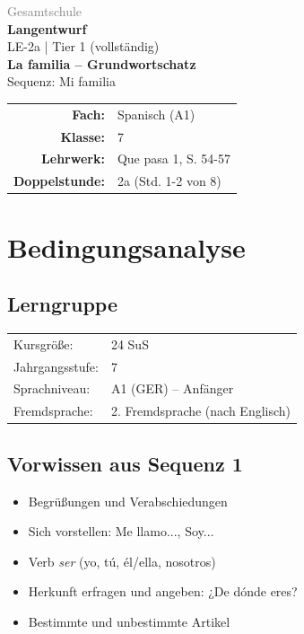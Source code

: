 \documentclass[11pt,a4paper]{article}
\newcommand{\fach}{Spanisch}
\newcommand{\jahrgangsstufe}{7}
\newcommand{\schulart}{Gesamtschule}
\newcommand{\stundenthema}{La familia -- Grundwortschatz}
\newcommand{\reihenthema}{Mi familia}
\newcommand{\stundennummer}{2a}
\newcommand{\gerniveau}{A1}
\newcommand{\lehrwerk}{Que pasa 1}
\newcommand{\lehrwerkseite}{S. 54-57}
\newcommand{\lerngruppengroesse}{24}
\begin{document}
\begin{titlepage}
    \centering
    \vspace*{2cm}
    {\large\textcolor{gray}{\schulart}}\\[2cm]
    {\Huge\textcolor{fach}{\textbf{Langentwurf}}}\\[0.5cm]
    {\large LE-\stundennummer{} | Tier 1 (vollständig)}\\[2cm]
    {\LARGE\textbf{\stundenthema}}\\[0.5cm]
    {\large Sequenz: \reihenthema}\\[2cm]
    \begin{tabular}{rl}
        \textbf{Fach:} & \fach{} (\gerniveau) \\[0.3cm]
        \textbf{Klasse:} & \jahrgangsstufe \\[0.3cm]
        \textbf{Lehrwerk:} & \lehrwerk, \lehrwerkseite \\[0.3cm]
        \textbf{Doppelstunde:} & \stundennummer{} (Std. 1-2 von 8) \\[0.3cm]
    \end{tabular}
    \vfill
\end{titlepage}

\tableofcontents
\newpage

\section{Bedingungsanalyse}

\subsection{Lerngruppe}
\begin{tabular}{ll}
    Kursgröße: & \lerngruppengroesse{} SuS \\
    Jahrgangsstufe: & \jahrgangsstufe \\
    Sprachniveau: & \gerniveau{} (GER) -- Anfänger \\
    Fremdsprache: & 2. Fremdsprache (nach Englisch) \\
\end{tabular}

\subsection{Vorwissen aus Sequenz 1}
\begin{itemize}
    \item Begrüßungen und Verabschiedungen
    \item Sich vorstellen: Me llamo..., Soy...
    \item Verb \textit{ser} (yo, tú, él/ella, nosotros)
    \item Herkunft erfragen und angeben: ¿De dónde eres?
    \item Bestimmte und unbestimmte Artikel
\end{itemize}
\end{document}
